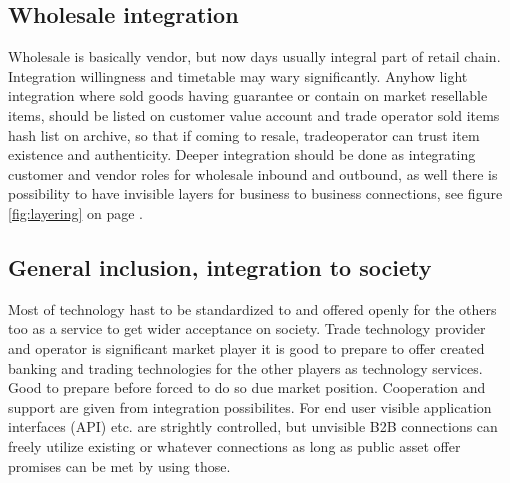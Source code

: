 \subsection{Wholesale integration}
\label{wholesale}
Wholesale is basically vendor, but now days usually integral part of retail
chain. Integration willingness and timetable may wary significantly. Anyhow
light integration where sold goods having guarantee or contain on market
resellable items, should be listed on customer value account and trade
operator sold items hash list on archive, so that if coming to resale,
tradeoperator can trust item existence and authenticity. Deeper integration
should be done as integrating customer and vendor roles for wholesale inbound
and outbound, as well there is possibility to have invisible layers for
business to business connections, see figure \ref{fig:layering} on page
\pageref{fig:layering}.

\subsection{General inclusion, integration to society}
\label{inclusion}

Most of technology hast to be standardized to and offered openly for the
others too as a service to get wider acceptance on society. Trade technology
provider and operator is significant market player it is good to prepare to
offer created banking and trading technologies for the other players as
technology services. Good to prepare before forced to do so due market
position. Cooperation and support are given from integration possibilites.
For end user visible application interfaces (API) etc. are strightly
controlled, but unvisible B2B connections can freely utilize existing or
whatever connections as long as public asset offer promises can be met by
using those.


